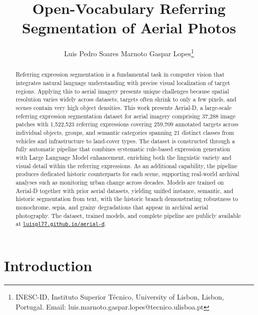 \documentclass[journal]{IEEEtran}
\begin{document}
\title{Open-Vocabulary Referring Segmentation of Aerial Photos}
\author{Luis Pedro Soares Marnoto Gaspar Lopes\thanks{INESC-ID, Instituto Superior Técnico, University of Lisbon, Lisbon, Portugal. Email: luis.marnoto.gaspar.lopes@tecnico.ulisboa.pt}}

\maketitle

\begin{abstract}
Referring expression segmentation is a fundamental task in computer vision that integrates natural language understanding with precise visual localization of target regions. Applying this to aerial imagery presents unique challenges because spatial resolution varies widely across datasets, targets often shrink to only a few pixels, and scenes contain very high object densities. This work presents Aerial-D, a large-scale referring expression segmentation dataset for aerial imagery comprising 37,288 image patches with 1,522,523 referring expressions covering 259,709 annotated targets across individual objects, groups, and semantic categories spanning 21 distinct classes from vehicles and infrastructure to land-cover types. The dataset is constructed through a fully automatic pipeline that combines systematic rule-based expression generation with Large Language Model enhancement, enriching both the linguistic variety and visual detail within the referring expressions. As an additional capability, the pipeline produces dedicated historic counterparts for each scene, supporting real-world archival analyses such as monitoring urban change across decades. Models are trained on Aerial-D together with prior aerial datasets, yielding unified instance, semantic, and historic segmentation from text, with the historic branch demonstrating robustness to monochrome, sepia, and grainy degradations that appear in archival aerial photography. The dataset, trained models, and complete pipeline are publicly available at \href{https://luispl77.github.io/aerial-d/}{\texttt{luispl77.github.io/aerial-d}}.

\vspace{0.3cm}


\end{abstract}

\section{Introduction}
\label{sec:intro}
\end{document}
